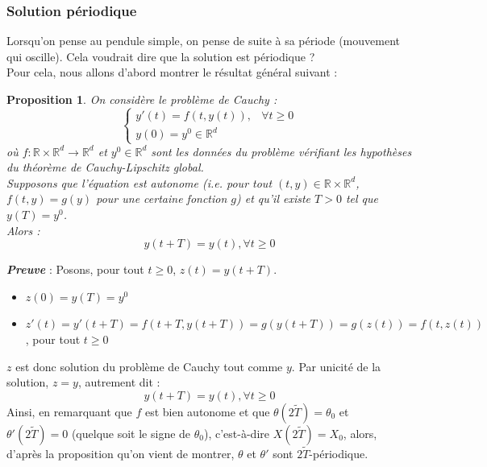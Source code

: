 \documentclass[9pt,a4paper]{article}
\newtheorem{prop}{Proposition}
\begin{document}
\subsubsection{Solution périodique}
Lorsqu'on pense au pendule simple, on pense de suite à sa période (mouvement qui oscille). Cela voudrait dire que la solution est périodique ?\\
Pour cela, nous allons d'abord montrer le résultat général suivant :
\begin{tcolorbox}[colback=green!5!white, colframe=green!50!black]
    \begin{prop}
        On considère le problème de Cauchy :
        $$
        \left\{
    \begin{array}{lcl}
        y'(t) = f(t, y(t)), & \forall t \geq 0 \\
        y(0) = y^0 \in \mathbb{R}^d
    \end{array}
    \right.
        $$
        où $f : \mathbb{R} \times \mathbb{R}^d \longrightarrow \mathbb{R}^d$ et $y^0 \in \mathbb{R}^d$ sont les données du problème vérifiant les hypothèses du théorème de Cauchy-Lipschitz global.\\
        Supposons que l'équation est autonome (i.e. pour tout $(t, y) \in \mathbb{R} \times \mathbb{R}^d$, $f(t, y) = g(y)$ pour une certaine fonction $g$) et qu'il existe $T > 0$ tel que $y(T) = y^0$.\\
        Alors :
        $$
        y(t + T) = y(t), \forall t \geq 0
        $$
    \end{prop}
\end{tcolorbox}
\textbf{\textit{Preuve}} : Posons, pour tout $t \geq 0$, $z(t) = y(t + T)$.
\begin{itemize}[label=\textbullet]
    \item $z(0) = y(T) = y^0$
    \item $z'(t) = y'(t + T) = f(t + T, y(t + T)) = g(y(t + T)) = g(z(t)) = f(t, z(t))$, pour tout $t \geq 0$
\end{itemize}
$z$ est donc solution du problème de Cauchy tout comme $y$. Par unicité de la solution, $z = y$, autrement dit :
$$
y(t + T) = y(t), \forall t \geq 0
$$
Ainsi, en remarquant que $f$ est bien autonome et que $\theta(2\tilde{T}) = \theta_0$ et $\theta'(2\tilde{T}) = 0$ (quelque soit le signe de $\theta_0$), c'est-à-dire $X(2\tilde{T}) = X_0$, alors, d'après la proposition qu'on vient de montrer, $\theta$ et $\theta'$ sont $2\tilde{T}$-périodique.
\end{document}
